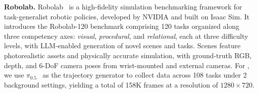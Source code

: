 \textbf{Robolab.}
Robolab~\citep{yang2026robolab} is a high-fidelity simulation benchmarking framework for task-generalist robotic policies, developed by NVIDIA and built on Isaac Sim.
%
It introduces the Robolab-120 benchmark comprising 120 tasks organized along three competency axes: \textit{visual}, \textit{procedural}, and \textit{relational}, each at three difficulty levels, with LLM-enabled generation of novel scenes and tasks.
%
Scenes feature photorealistic assets and physically accurate simulation, with ground-truth RGB, depth, and 6-DoF camera poses from wrist-mounted and external cameras.
%
For \dataset, we use $\pi_{0.5}$~\citep{intelligence2025pi05} as the trajectory generator to collect data across 108 tasks under 2 background settings, yielding a total of 158K frames at a resolution of $1280 \times 720$.
